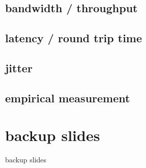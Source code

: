 \date{}
\title{}
\date{}

\begin{frame}
    \titlepage
\end{frame}

\subsection{bandwidth / throughput}


\subsection{latency / round trip time}


\subsection{jitter}


\subsection{empirical measurement}



\section{backup slides}
\begin{frame}{backup slides}
\end{frame}


